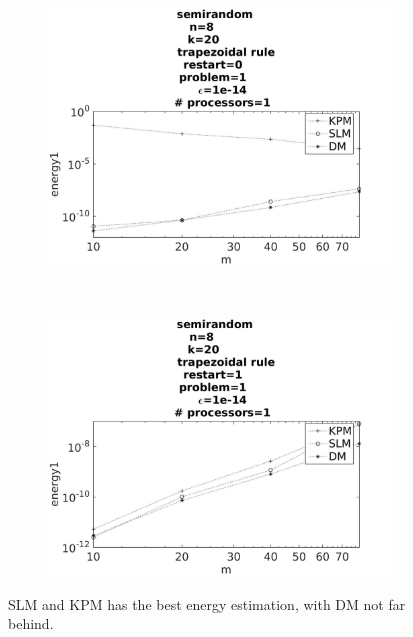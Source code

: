 \begin{figure}[H]
        \centering
        \begin{subfigure}[b]{0.45\textwidth}
                \includegraphics[width=\textwidth]{../MATLAB/fig/sresultenergyr.jpg}
                \caption{  }
                \label{fig:sresultenergy1}
        \end{subfigure}
        ~
        \begin{subfigure}[b]{0.45\textwidth}
                \includegraphics[width=\textwidth]{../MATLAB/fig/sresultenergy.jpg}
                \caption{  }
                \label{fig:sresultenergy2}
        \end{subfigure}
        \caption{ SLM and KPM has the best energy estimation, with DM not far behind. }
        \label{fig:sresultenergy}
\end{figure}

